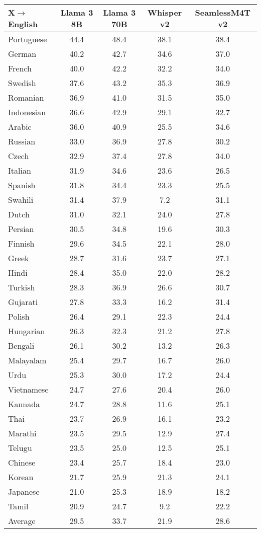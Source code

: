 \begin{NiceTabular}{lcccc}
	\CodeBefore
	\Body
	\toprule
	X$\rightarrow$English & Llama 3 8B & Llama 3 70B & Whisper v2 & SeamlessM4T v2 \\
	\midrule
	Portuguese	&	44.4	&	48.4	&	38.1	&	38.4	\\
	German	&	40.2	&	42.7	&	34.6	&	37.0	\\
	French	&	40.0	&	42.2	&	32.2	&	34.0	\\
	Swedish	&	37.6	&	43.2	&	35.3	&	36.9	\\
	Romanian	&	36.9	&	41.0	&	31.5	&	35.0	\\
	Indonesian	&	36.6	&	42.9	&	29.1	&	32.7	\\
	Arabic	&	36.0	&	40.9	&	25.5	&	34.6	\\
	Russian	&	33.0	&	36.9	&	27.8	&	30.2	\\
	Czech	&	32.9	&	37.4	&	27.8	&	34.0	\\
	Italian	&	31.9	&	34.6	&	23.6	&	26.5	\\
	Spanish	&	31.8	&	34.4	&	23.3	&	25.5	\\
	Swahili	&	31.4	&	37.9	&	7.2	&	31.1	\\
	Dutch	&	31.0	&	32.1	&	24.0	&	27.8	\\
	Persian	&	30.5	&	34.8	&	19.6	&	30.3	\\
	Finnish	&	29.6	&	34.5	&	22.1	&	28.0	\\
	Greek	&	28.7	&	31.6	&	23.7	&	27.1	\\
	Hindi	&	28.4	&	35.0	&	22.0	&	28.2	\\
	Turkish	&	28.3	&	36.9	&	26.6	&	30.7	\\
	Gujarati	&	27.8	&	33.3	&	16.2	&	31.4	\\
	Polish	&	26.4	&	29.1	&	22.3	&	24.4	\\
	Hungarian	&	26.3	&	32.3	&	21.2	&	27.8	\\
	Bengali	&	26.1	&	30.2	&	13.2	&	26.3	\\
	Malayalam	&	25.4	&	29.7	&	16.7	&	26.0	\\
	Urdu	&	25.3	&	30.0	&	17.2	&	24.4	\\
	Vietnamese	&	24.7	&	27.6	&	20.4	&	26.0	\\
	Kannada	&	24.7	&	28.8	&	11.6	&	25.1	\\
	Thai	&	23.7	&	26.9	&	16.1	&	23.2	\\
	Marathi	&	23.5	&	29.5	&	12.9	&	27.4	\\
	Telugu	&	23.5	&	25.0	&	12.5	&	25.1	\\
	Chinese	&	23.4	&	25.7	&	18.4	&	23.0	\\
	Korean	&	21.7	&	25.9	&	21.3	&	24.1	\\
	Japanese	&	21.0	&	25.3	&	18.9	&	18.2	\\
	Tamil	&	20.9	&	24.7	&	9.2	&	22.2	\\
	\midrule
	Average & 29.5 & 33.7 & 21.9 & 28.6 \\
	\bottomrule
\end{NiceTabular}
